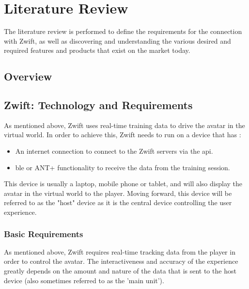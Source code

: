 
\chapter{Literature Review}


The literature review is performed to define the requirements for the connection with Zwift, as well as discovering and understanding the various desired and required features and products that exist on the market today.

\section{Overview}

\newpage

\section{Zwift: Technology and Requirements}

As mentioned above, Zwift uses real-time training data to drive the avatar in the virtual world. In order to achieve this, Zwift needs to run on a device that has :

\begin{itemize}
	\item An internet connection to connect to the Zwift servers via the \ac{api}.
	\item \ac{ble} or ANT+ functionality to receive the data from the training session.
\end{itemize}

This device is usually a laptop, mobile phone or tablet, and will also display the avatar in the virtual world to the player. Moving forward, this device will be referred to as the "host" device as it is the central device controlling the user experience. \citep{Bromley:2022}

\subsection{Basic Requirements}
As mentioned above, Zwift requires real-time tracking data from the player in order to control the avatar. The interactiveness and accuracy of the experience greatly depends on the amount and nature of the data that is sent to the host device (also sometimes referred to as the 'main unit').


